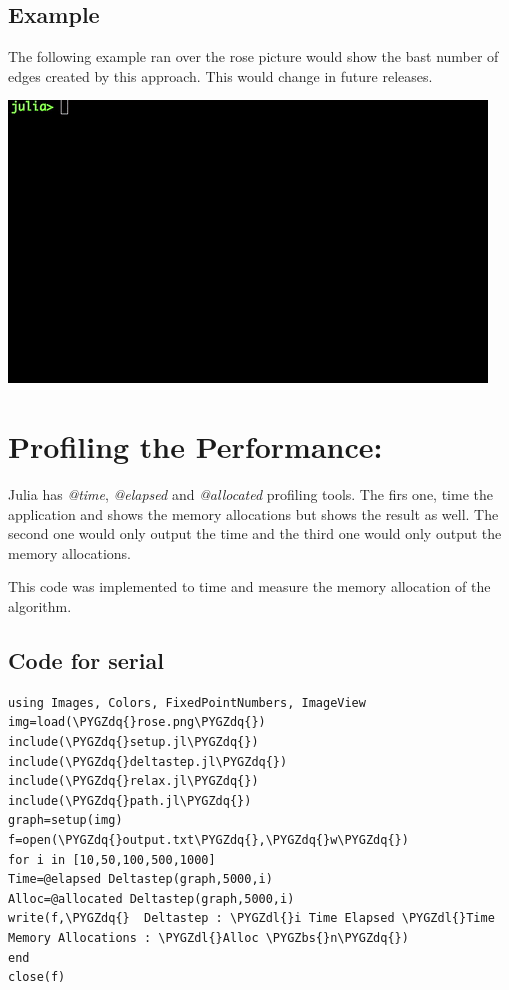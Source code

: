 \documentclass[letterpaper,10pt,english]{sphinxmanual}
\def\PYGZbs{\char`\\}
\def\PYGZdl{\char`\$}
\def\PYGZdq{\char`\"}
\begin{document}
\section{Example}
\label{setup:example}
The following example ran over the rose picture would show the bast number of edges created by this approach. This would change in future releases.

\includegraphics{setup.gif}


\chapter{Profiling the Performance:}
\label{profiling:profiling-the-performance}\label{profiling:profiling}\label{profiling::doc}
Julia has \emph{@time}, \emph{@elapsed} and  \emph{@allocated} profiling tools. The firs one, time the application and shows the memory allocations  but shows the result as well. The second one would only output the time and the third one would only output the memory allocations.

This code was implemented to time and measure the memory allocation of the algorithm.


\section{Code for serial}
\label{profiling:code-for-serial}
\begin{Verbatim}[commandchars=\\\{\}]
using Images, Colors, FixedPointNumbers, ImageView
img=load(\PYGZdq{}rose.png\PYGZdq{})
include(\PYGZdq{}setup.jl\PYGZdq{})
include(\PYGZdq{}deltastep.jl\PYGZdq{})
include(\PYGZdq{}relax.jl\PYGZdq{})
include(\PYGZdq{}path.jl\PYGZdq{})
graph=setup(img)
f=open(\PYGZdq{}output.txt\PYGZdq{},\PYGZdq{}w\PYGZdq{})
for i in [10,50,100,500,1000]
Time=@elapsed Deltastep(graph,5000,i)
Alloc=@allocated Deltastep(graph,5000,i)
write(f,\PYGZdq{}  Deltastep : \PYGZdl{}i Time Elapsed \PYGZdl{}Time Memory Allocations : \PYGZdl{}Alloc \PYGZbs{}n\PYGZdq{})
end
close(f)
\end{Verbatim}
\end{document}
